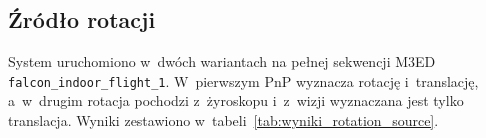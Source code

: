 \clearpage

\subsection{Źródło rotacji}
\label{subsec:wyniki_rotation_source}

System uruchomiono w~dwóch wariantach na pełnej sekwencji M3ED \texttt{falcon\_indoor\_flight\_1}. W~pierwszym PnP wyznacza rotację i~translację, a~w~drugim rotacja pochodzi z~żyroskopu i~z~wizji wyznaczana jest tylko translacja. Wyniki zestawiono w~tabeli~\ref{tab:wyniki_rotation_source}.

\begin{table}[!ht]
    \centering
    \small
    \caption{Porównanie źródła rotacji na pełnej sekwencji M3ED \texttt{falcon\_indoor\_flight\_1}; wyrównanie $SE(3)$, RPE dla około 1~s.}
    \label{tab:wyniki_rotation_source}
\end{table}

